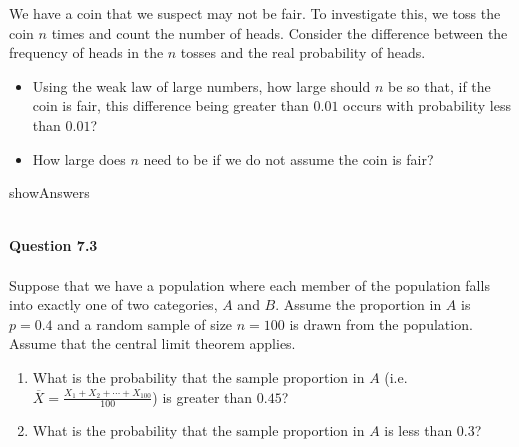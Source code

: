 \documentclass{article}
\begin{document}
We have a coin that we suspect may not be fair. To investigate this, we toss the coin $n$ times and count the number of heads.
%
Consider the difference between the frequency of heads in the $n$ tosses and the real probability of heads.
\begin{itemize}
\item[(a)] Using the weak law of large numbers, how large should $n$ be so that, if the coin is fair, this difference being greater than $0.01$ occurs with probability less than $0.01$?
\item[(b)] How large does \(n\) need to be if we do not assume the coin is fair?
\end{itemize}
\begin{maybePrint}{showAnswers}
~\\~\\
\end{maybePrint}
%
%
{\bf Question 7.3}
~\\~\\
Suppose that we have a population where each member of the population falls into exactly one of two categories, $A$ and $B$. Assume the proportion in $A$ is $p=0.4$ and a
random sample of size $n=100$ is drawn from the population. Assume that the central limit theorem applies. 
\begin{enumerate}
\item[(a)] What is the probability that the sample proportion  in $A$ (i.e. $\overline X=\frac{X_1+X_2+\cdots+X_{100}}{100}$) is greater than
\(0.45\)?
\item[(b)] What is the probability that the sample proportion in $A$  is less than \(0.3\)?
\end{enumerate}
\end{document}

